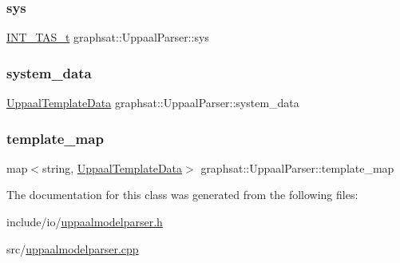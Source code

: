 \mbox{\label{classgraphsat_1_1_uppaal_parser_a1a08527d766eab0bf83e019c3698264c}} 
\subsubsection{\texorpdfstring{sys}{sys}}
{\footnotesize\ttfamily \mbox{\hyperlink{namespacegraphsat_a72468138834e9a7182f32fed8035a2de}{I\+N\+T\+\_\+\+T\+A\+S\+\_\+t}} graphsat\+::\+Uppaal\+Parser\+::sys\hspace{0.3cm}{\ttfamily [private]}}

\mbox{\label{classgraphsat_1_1_uppaal_parser_a43fcbc15cd57d79d8852e6b3b7c0aacd}} 
\subsubsection{\texorpdfstring{system\_data}{system\_data}}
{\footnotesize\ttfamily \mbox{\hyperlink{classgraphsat_1_1_uppaal_template_data}{Uppaal\+Template\+Data}} graphsat\+::\+Uppaal\+Parser\+::system\+\_\+data\hspace{0.3cm}{\ttfamily [private]}}

\mbox{\label{classgraphsat_1_1_uppaal_parser_aa4059e649e542e41dcbd90a3d980db2d}} 
\subsubsection{\texorpdfstring{template\_map}{template\_map}}
{\footnotesize\ttfamily map$<$string, \mbox{\hyperlink{classgraphsat_1_1_uppaal_template_data}{Uppaal\+Template\+Data}}$>$ graphsat\+::\+Uppaal\+Parser\+::template\+\_\+map\hspace{0.3cm}{\ttfamily [private]}}



The documentation for this class was generated from the following files\+:\begin{DoxyCompactItemize}
\item 
include/io/\mbox{\hyperlink{uppaalmodelparser_8h}{uppaalmodelparser.\+h}}\item 
src/\mbox{\hyperlink{uppaalmodelparser_8cpp}{uppaalmodelparser.\+cpp}}\end{DoxyCompactItemize}
